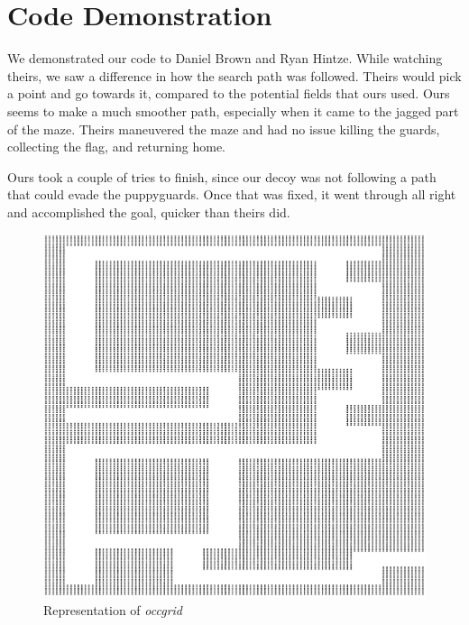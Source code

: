 \documentclass{article}
\begin{document}
\section{Code Demonstration}
We demonstrated our code to Daniel Brown and Ryan Hintze. While watching theirs, we saw a difference in how the search path was followed.  Theirs would pick a point and go towards it, compared to the potential fields that ours used.  Ours seems to make a much smoother path, especially when it came to the jagged part of the maze. Theirs maneuvered the maze and had no issue killing the guards, collecting the flag, and returning home.

Ours took a couple of tries to finish, since our decoy was not following a path that could evade the puppyguards.  Once that was fixed, it went through all right and accomplished the goal, quicker than theirs did.

\newpage

\begin{figure}
	\begin{center}
	\includegraphics[width=\textwidth]{graphics/world.eps}
	\end{center}
	\caption{Representation of \emph{occgrid}}
	\label{fig:occgrid}
\end{figure}
\end{document}
